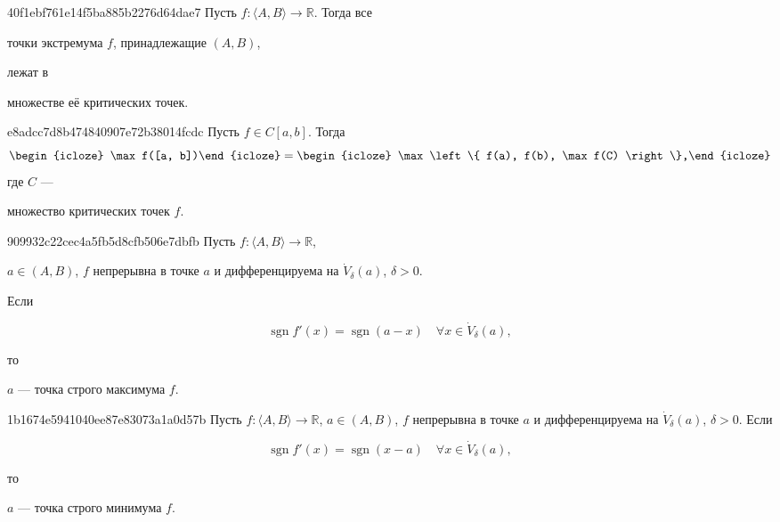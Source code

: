 \begin{note}{40f1ebf761e14f5ba885b2276d64dae7}
    Пусть \( f : \langle A, B \rangle \to \mathbb R  \). Тогда все
    \begin{icloze}{2}точки экстремума \( f \), принадлежащие \( (A, B) \),\end{icloze}
    лежат в \begin{icloze}{1}множестве её критических точек.\end{icloze}
\end{note}

\begin{note}{e8adcc7d8b474840907e72b38014fcdc}
    Пусть \( f \in C[a, b] \). Тогда
    \[
        \begin{icloze}{3}\max f([a, b])\end{icloze} = \begin{icloze}{1}\max \left\{ f(a), f(b), \max f(C) \right\},\end{icloze}
    \]
    где \( C \) --- \begin{icloze}{2}множество критических точек \( f \).\end{icloze}
\end{note}

\begin{note}{909932c22cec4a5fb5d8cfb506e7dbfb}
    Пусть \( f : \langle A, B \rangle \to \mathbb R \), \begin{icloze}{3}\( a \in (A, B)  \), \( f \) непрерывна в точке \( a \) и дифференцируема на \( \dot V_{\delta} (a) \), \( \delta > 0 \).\end{icloze}
    Если
    \begin{icloze}{1}\[
        \operatorname{sgn} f'(x) = \operatorname{sgn} (a - x) \quad \forall x \in \dot V_{\delta} (a),
    \]\end{icloze}
    то \begin{icloze}{2}\( a \) --- точка строго максимума \( f \).\end{icloze}
\end{note}

\begin{note}{1b1674e5941040ee87e83073a1a0d57b}
    Пусть \( f : \langle A, B \rangle \to \mathbb R \), \( a \in (A, B)  \), \( f \) непрерывна в точке \( a \) и дифференцируема на \( \dot V_{\delta} (a) \), \( \delta > 0 \).
    Если
    \begin{icloze}{1}\[
        \operatorname{sgn} f'(x) = \operatorname{sgn} (x - a) \quad \forall x \in \dot V_{\delta} (a),
    \]\end{icloze}
    то \begin{icloze}{2}\( a \) --- точка строго минимума \( f \).\end{icloze}
\end{note}


